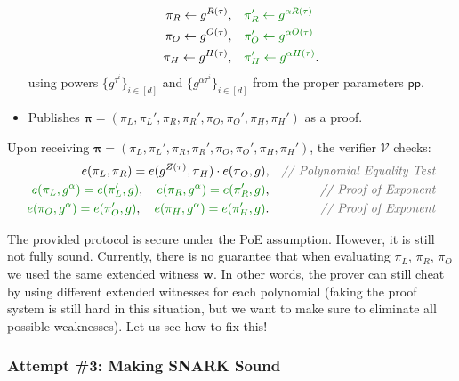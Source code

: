 \documentclass[../lecture-notes.tex]{subfiles}
\begin{document}
\begin{tcolorbox}
\begin{itemize}[label=]
\begin{align*}
            \pi_R \gets g^{R(\tau)}, & \quad\textcolor{green!50!black}{\pi_R' \gets g^{\alpha R(\tau)}} \\
            \pi_O \gets g^{O(\tau)}, & \quad\textcolor{green!50!black}{\pi_O' \gets g^{\alpha O(\tau)}} \\
            \pi_H \gets g^{H(\tau)}, & \quad\textcolor{green!50!black}{\pi_H' \gets g^{\alpha H(\tau)}}.
        \end{align*}
        using powers $\{g^{\tau^i}\}_{i \in [d]}$ and $\{g^{\alpha\tau^i}\}_{i \in [d]}$ from the proper parameters $\mathsf{pp}$.
        \item Publishes $\boldsymbol{\pi} = (\pi_L,\pi_L',\pi_R,\pi_R',\pi_O,\pi_O',\pi_H,\pi_H')$ as a proof.
    \end{itemize}
    Upon receiving $\boldsymbol{\pi} = (\pi_L,\pi_L',\pi_R,\pi_R',\pi_O,\pi_O',\pi_H,\pi_H')$, the verifier $\mathcal{V}$ checks:
    \begin{align*}
        e(\pi_L, \pi_R) = e(g^{Z(\tau)}, \pi_H) \cdot e(\pi_O, g), && \textcolor{gray!80!black}{\textit{// Polynomial Equality Test}} \\
        \textcolor{green!50!black}{e(\pi_L, g^{\alpha}) = e(\pi_L', g)}, \quad \textcolor{green!50!black}{e(\pi_R, g^{\alpha}) = e(\pi_R', g)}, && \textcolor{gray!80!black}{\textit{// Proof of Exponent}} \\
        \textcolor{green!50!black}{e(\pi_O, g^{\alpha}) = e(\pi_O', g)}, \quad \textcolor{green!50!black}{e(\pi_H, g^{\alpha}) = e(\pi_H', g)}. && \textcolor{gray!80!black}{\textit{// Proof of Exponent}}
    \end{align*}
\end{tcolorbox}

The provided protocol is secure under the PoE assumption. However, it is still not fully sound. Currently, there is no guarantee that when evaluating $\pi_L$, $\pi_R$, $\pi_O$ we used the same extended witness $\mathbf{w}$. In other words, the prover can still cheat by using different extended witnesses for each polynomial (faking the proof system is still hard in this situation, but we want to make sure to eliminate all possible weaknesses). Let us see how to fix this!

\subsubsection{Attempt \#3: Making SNARK Sound}
\end{document}
